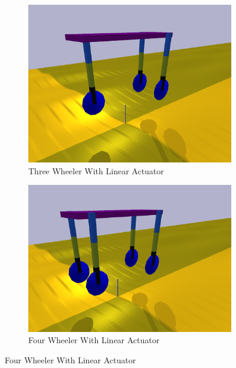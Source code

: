 \begin{figure}[h!]
    \centering
    \begin{subfigure}[b]{0.45\linewidth}
        \centering
        \includegraphics[width=\linewidth]{Figures/ch8_LinearThreeWheel.png}
        \caption{Three Wheeler With Linear Actuator}
    \end{subfigure}
    \hfill
    \begin{subfigure}[b]{0.45\linewidth}
        \centering
        \includegraphics[width=\linewidth]{Figures/ch8_LinearFourWheel.png}
        \caption{Four Wheeler With Linear Actuator}
    \end{subfigure}
    
    \vspace{0.5cm}
    

\end{figure}
